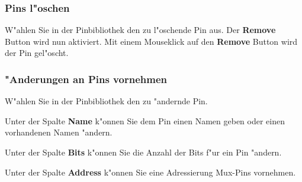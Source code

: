 \documentclass[a4paper,titlepage,12pt,ngerman]{scrbook}
\begin{document}
\subsubsection{Pins l"oschen}
W"ahlen Sie in der Pinbibliothek den zu l"oschende Pin aus. Der {\bf Remove} Button wird nun aktiviert. Mit einem Mouseklick auf den {\bf Remove} Button wird der Pin gel"oscht.
\subsubsection{"Anderungen an Pins vornehmen}
W"ahlen Sie in der Pinbibliothek den zu "andernde Pin.\par
Unter der Spalte {\bf Name} k"onnen Sie dem Pin einen Namen geben oder einen vorhandenen Namen "andern.\par
Unter der Spalte {\bf Bits} k"onnen Sie die Anzahl der Bits f"ur ein Pin "andern.\par
Unter der Spalte {\bf Address} k"onnen Sie eine Adressierung Mux-Pins vornehmen.\par
\end{document}
